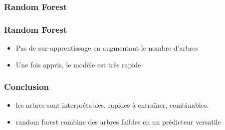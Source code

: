 \begin{frame}
  \frametitle{Random Forest}
\end{frame}

\begin{frame}
  \frametitle{Random Forest}
  \begin{itemize}
  \item Pas de sur-apprentissage en augmentant le nombre d'arbres
  \item Une fois appris, le modèle est très rapide
  \end{itemize}
\end{frame}

\begin{frame}
  \frametitle{Conclusion}
  \begin{itemize}
  \item les arbres sont interprétables, rapides à entraîner,
    combinables.
  \item random forest combine des arbres faibles en un prédicteur
    versatile
  \end{itemize}
\end{frame}
